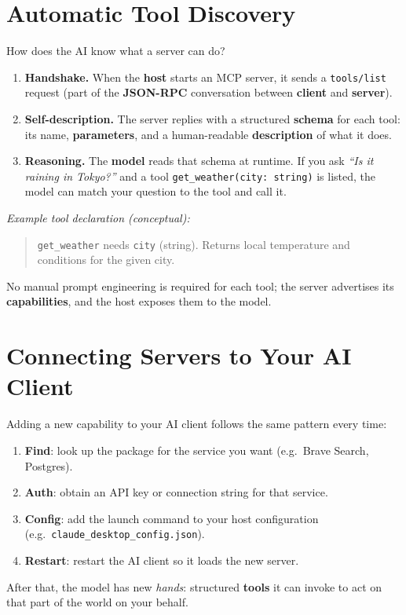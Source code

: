\section{Automatic Tool Discovery}

How does the AI know what a server can do?

\begin{enumerate}
  \item \textbf{Handshake.}
    When the \textbf{host} starts an MCP server, it sends a \lstinline[style=inline]|tools/list| request
    (part of the \textbf{JSON-RPC} conversation between \textbf{client} and
    \textbf{server}).
  \item \textbf{Self-description.}
    The server replies with a structured \textbf{schema} for each tool: its name,
    \textbf{parameters}, and a human-readable \textbf{description} of what it does.
  \item \textbf{Reasoning.}
    The \textbf{model} reads that schema at runtime.
    If you ask \emph{``Is it raining in Tokyo?''} and a tool
    \lstinline[style=inline]|get_weather(city: string)| is listed, the model can match your question
    to the tool and call it.
\end{enumerate}

\textit{Example tool declaration (conceptual):}
\begin{quote}
  \lstinline[style=inline]|get_weather| needs \lstinline[style=inline]|city| (string).
  Returns local temperature and conditions for the given city.
\end{quote}

No manual prompt engineering is required for each tool; the server advertises its
\textbf{capabilities}, and the host exposes them to the model.

\section{Connecting Servers to Your AI Client}

Adding a new capability to your AI client follows the same pattern every time:

\begin{enumerate}
  \item \textbf{Find}: look up the package for the service you want
  (e.g.\ Brave Search, Postgres).
  \item \textbf{Auth}: obtain an API key or connection string for that service.
  \item \textbf{Config}: add the launch command to your host configuration
  (e.g.\ \lstinline[style=inline]|claude_desktop_config.json|).
  \item \textbf{Restart}: restart the AI client so it loads the new server.
\end{enumerate}

After that, the model has new \emph{hands}: structured \textbf{tools} it can invoke to
act on that part of the world on your behalf.
